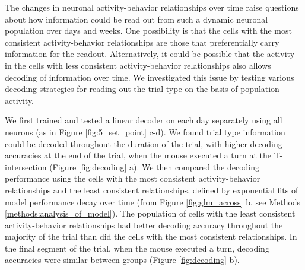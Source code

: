 The changes in neuronal activity-behavior relationships over time raise questions about how information could be read out from such a dynamic neuronal population over days and weeks. One possibility is that the cells with the most consistent activity-behavior relationships are those that preferentially carry information for the readout. Alternatively, it could be possible that the activity in the cells with less consistent activity-behavior relationships also allows decoding of information over time. We investigated this issue by testing various decoding strategies for reading out the trial type on the basis of population activity.

\bigskip

We first trained and tested a linear decoder on each day separately using all neurons (as in Figure \ref{fig:5_set_point} c-d). We found trial type information could be decoded throughout the duration of the trial, with higher decoding accuracies at the end of the trial, when the mouse executed a turn at the T-intersection (Figure \ref{fig:decoding} a). We then compared the decoding performance using the cells with the most consistent activity-behavior relationships and the least consistent relationships, defined by exponential fits of model performance decay over time (from Figure \ref{fig:glm_across} b, see Methods \ref{methods:analysis_of_model}). The population of cells with the least consistent activity-behavior relationships had better decoding accuracy throughout the majority of the trial than did the cells with the most consistent relationships. In the final segment of the trial, when the mouse executed a turn, decoding accuracies were similar between groups (Figure \ref{fig:decoding} b). 

